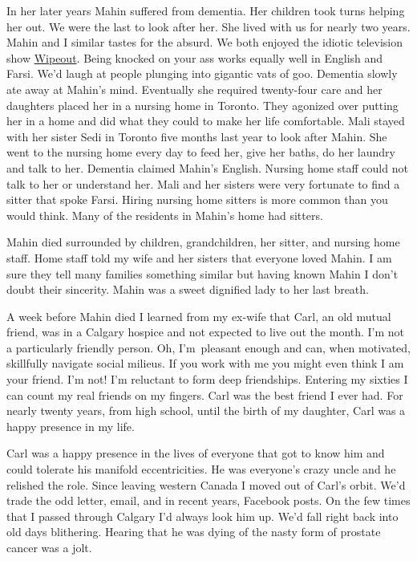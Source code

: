 In her later years Mahin suffered from dementia. Her children took turns
helping her out. We were the last to look after her. She lived with us
for nearly two years. Mahin and I similar tastes for the absurd. We both
enjoyed the idiotic television show
\href{http://abc.go.com/shows/wipeout}{Wipeout}. Being knocked on your
ass works equally well in English and Farsi. We'd laugh at people
plunging into gigantic vats of goo. Dementia slowly ate away at Mahin's
mind. Eventually she required twenty-four care and her daughters placed
her in a nursing home in Toronto. They agonized over putting her in a
home and did what they could to make her life comfortable. Mali stayed
with her sister Sedi in Toronto five months last year to look after
Mahin. She went to the nursing home every day to feed her, give her
baths, do her laundry and talk to her. Dementia claimed Mahin's English.
Nursing home staff could not talk to her or understand her. Mali and her
sisters were very fortunate to find a sitter that spoke Farsi. Hiring
nursing home sitters is more common than you would think. Many of the
residents in Mahin's home had sitters.

Mahin died surrounded by children, grandchildren, her sitter, and
nursing home staff. Home staff told my wife and her sisters that
everyone loved Mahin. I am sure they tell many families something
similar but having known Mahin I don't doubt their sincerity. Mahin was
a sweet dignified lady to her last breath.

A week before Mahin died I learned from my ex-wife that Carl, an old
mutual friend, was in a Calgary hospice and not expected to live out the
month. I'm not a particularly friendly person. Oh, I'm~pleasant enough
and can, when motivated, skillfully navigate social milieus. If you work
with me you might even think I am your friend. I'm not! I'm reluctant to
form deep friendships. Entering my sixties I can count my real friends
on my fingers. Carl was the best friend I ever had. For nearly twenty
years, from high school, until the birth of my daughter, Carl was a
happy presence in my life.

Carl was a happy presence in the lives of everyone that got to know him
and could tolerate his manifold eccentricities. He was everyone's crazy
uncle and he relished the role. Since leaving western Canada I moved out
of Carl's orbit. We'd trade the odd letter, email, and in recent years,
Facebook posts. On the few times that I passed through Calgary I'd
always look him up. We'd fall right back into old days blithering.
Hearing that he was dying of the nasty form of prostate cancer was a
jolt.

